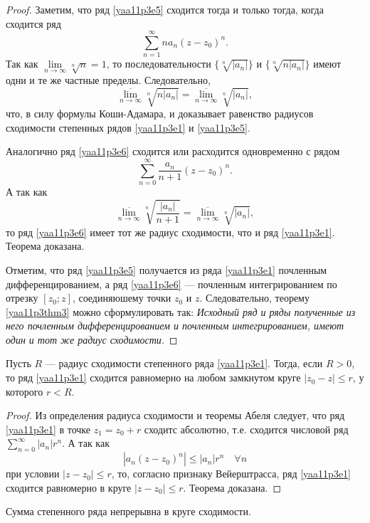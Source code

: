 \begin{proof}
Заметим, что ряд \eqref{yaa11p3e5} сходится тогда и только тогда, когда сходится ряд
$$
\sum\limits_{n=1}^{\infty}na_n(z-z_0)^n.
$$
Так как $\lim\limits_{n\to\infty} \sqrt[n]{n} = 1$, то последовательности $\{\sqrt[n]{|a_n|}\}$ и $\{\sqrt[n]{n|a_n|}\}$ имеют одни и те же частные пределы. Следовательно,
$$
\overline{\lim\limits_{n\to\infty}}\sqrt[n]{n|a_n|}=\overline{\lim\limits_{n\to\infty}}\sqrt[n]{|a_n|},
$$
что, в силу формулы Коши-Адамара, и доказывает равенство радиусов сходимости степенных рядов \eqref{yaa11p3e1} и \eqref{yaa11p3e5}.

Аналогично ряд \eqref{yaa11p3e6} сходится или расходится одновременно с рядом
$$
\sum\limits_{n=0}^{\infty}\frac{a_n}{n+1}(z-z_0)^n.
$$
А так как 
$$
\overline{\lim\limits_{n\to\infty}}\sqrt[n]{\frac{|a_n|}{n+1}}=\overline{\lim\limits_{n\to\infty}}\sqrt[n]{|a_n|},
$$
то ряд \eqref{yaa11p3e6} имеет тот же радиус сходимости, что и ряд \eqref{yaa11p3e1}. Теорема доказана.

Отметим, что ряд \eqref{yaa11p3e5} получается из ряда \eqref{yaa11p3e1} почленным дифференцированием, а ряд \eqref{yaa11p3e6} --- почленным интегрированием по отрезку $[z_0;z]$, соединяюшему точки $z_0$ и $z$. Следовательно, теорему \eqref{yaa11p3thm3} можно сформулировать так:
\textit{Исходный ряд и ряды полученные из него почленным дифференцированием и почленным интегрированием, имеют один и тот же радиус сходимости.}

\end{proof}

\begin{thm}
Пусть $R$ --- радиус сходимости степенного ряда \eqref{yaa11p3e1}. Тогда, если $R>0$, то ряд \eqref{yaa11p3e1} сходится равномерно на любом замкнутом круге $|z_0-z|\le r$, у которого $r<R$.
\end{thm}

\begin{proof}
Из определения радиуса сходимости и теоремы Абеля следует, что ряд \eqref{yaa11p3e1} в точке $z_1=z_0+r$ сходитс абсолютно, т.е. сходится числовой ряд $\sum\limits_{n=0}^{\infty} |a_n|r^n$. А так как
$$
|a_n(z-z_0)^n|\le |a_n|r^n \quad \forall n
$$
при условии $|z-z_0|\le r$, то, согласно признаку Вейерштрасса, ряд \eqref{yaa11p3e1} сходится равномерно в круге $|z-z_0|\le r$. Теорема доказана.
\end{proof}

\begin{cons}
Сумма степенного ряда непрерывна в круге сходимости.
\end{cons}

